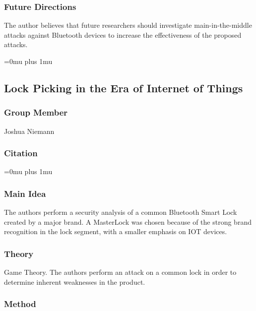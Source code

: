 \subsubsection{Future Directions}

\noindent
The author believes that future researchers should investigate main-in-the-middle attacks against Bluetooth devices to increase the effectiveness of the proposed attacks. 

\Urlmuskip=0mu plus 1mu\relax

\noindent
\subsection{{L}ock {P}icking in the {E}ra of {I}nternet of {T}hings}

\subsubsection{Group Member}

\noindent
Joshua Niemann

\noindent
\subsubsection{Citation}

\Urlmuskip=0mu plus 1mu\relax

\subsubsection{Main Idea}

\noindent
The authors perform a security analysis of a common Bluetooth Smart Lock created by a major brand.  A MasterLock was chosen because of the strong brand recognition in the lock segment, with a smaller emphasis on IOT devices.

\subsubsection{Theory}

\noindent
Game Theory.  The authors perform an attack on a common lock in order to determine inherent weaknesses in the product.

\subsubsection{Method}


